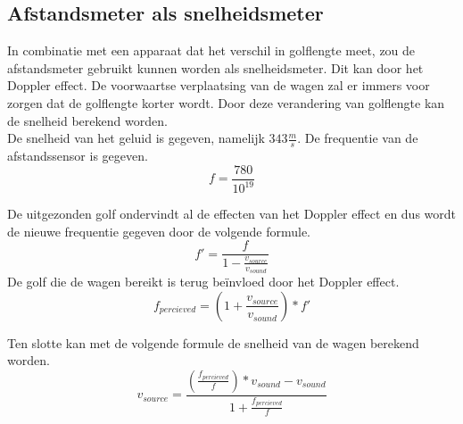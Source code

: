  

\subsection{Afstandsmeter als snelheidsmeter}
In combinatie met een apparaat dat het verschil in golflengte meet, zou de afstandsmeter gebruikt kunnen worden als snelheidsmeter. Dit kan door het Doppler effect. De voorwaartse verplaatsing van de wagen zal er immers voor zorgen dat de golflengte korter wordt. Door deze verandering van golflengte kan de snelheid berekend worden.\\

De snelheid van het geluid is gegeven, namelijk $343 \frac{m}{s}$. De frequentie van de afstandssensor is gegeven.
$$f=\frac{780}{10^{19}}$$

De uitgezonden golf ondervindt al de effecten van het Doppler effect en dus wordt de nieuwe frequentie gegeven door de volgende formule.
\begin{equation}
f'=\frac{f}{1-\frac{v_{source}}{v_{sound}}}
\end{equation}
De golf die de wagen bereikt is terug be\"invloed door het Doppler effect.
\begin{equation}
f_{percieved}=\left(1+\frac{v_{source}}{v_{sound}}\right)*f'
\end{equation}

Ten slotte kan met de volgende formule de snelheid van de wagen berekend worden.
\begin{equation}
v_{source} = \frac{\left(\frac{f_{percieved}}{f}\right)*v_{sound}-v_{sound}}{1+\frac{f_{percieved}}{f}}
\end{equation}
